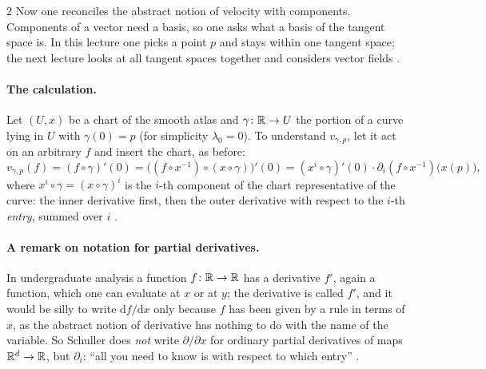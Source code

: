 \begin{paracol}{2}
Now one reconciles the abstract notion of velocity with components. Components of a vector need a basis, so one asks what a basis of the tangent space is. In this lecture one picks a point $p$ and stays within one tangent space; the next lecture looks at all tangent spaces together and considers vector fields
.

\paragraph{The calculation.} Let $(U,x)$ be a chart of the smooth atlas and $\gamma\colon\mathbb{R}\to U$ the portion of a curve lying in $U$ with $\gamma(0)=p$ (for simplicity $\lambda_0=0$). To understand $v_{\gamma,p}$, let it act on an arbitrary $f$ and insert the chart, as before:
\[
  v_{\gamma,p}(f)=(f\circ\gamma)'(0)=\bigl((f\circ x^{-1})\circ(x\circ\gamma)\bigr)'(0)=(x^i\circ\gamma)'(0)\cdot\partial_i(f\circ x^{-1})\bigl(x(p)\bigr),
\]
where $x^i\circ\gamma=(x\circ\gamma)^i$ is the $i$-th component of the chart representative of the curve: the inner derivative first, then the outer derivative with respect to the $i$-th \emph{entry}, summed over $i$ .

\paragraph{A remark on notation for partial derivatives.} In undergraduate analysis a function $f\colon\mathbb{R}\to\mathbb{R}$ has a derivative $f'$, again a function, which one can evaluate at $x$ or at $y$; the derivative is called $f'$, and it would be silly to write $\mathrm df/\mathrm dx$ only because $f$ has been given by a rule in terms of $x$, as the abstract notion of derivative has nothing to do with the name of the variable.
So Schuller does \emph{not} write $\partial/\partial x$ for ordinary partial derivatives of maps $\mathbb{R}^d\to\mathbb{R}$, but $\partial_i$: ``all you need to know is with respect to which entry'' .


\end{paracol}
